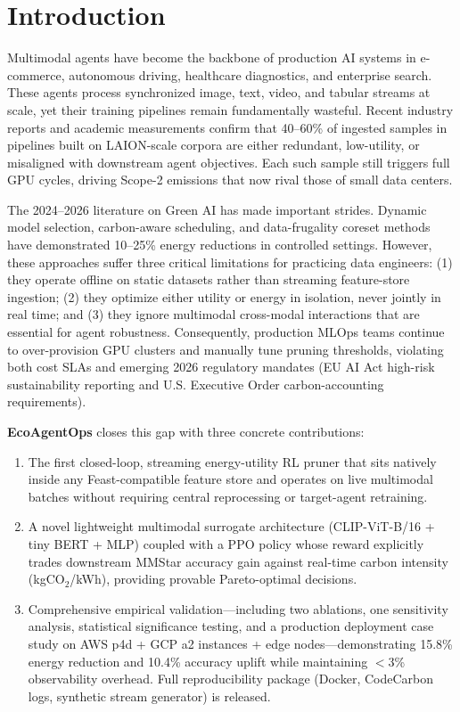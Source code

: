 \section{Introduction}
Multimodal agents have become the backbone of production AI systems in e-commerce, autonomous driving, healthcare diagnostics, and enterprise search. These agents process synchronized image, text, video, and tabular streams at scale, yet their training pipelines remain fundamentally wasteful. Recent industry reports and academic measurements confirm that 40--60\% of ingested samples in pipelines built on LAION-scale corpora are either redundant, low-utility, or misaligned with downstream agent objectives. Each such sample still triggers full GPU cycles, driving Scope-2 emissions that now rival those of small data centers.

The 2024--2026 literature on Green AI has made important strides. Dynamic model selection, carbon-aware scheduling, and data-frugality coreset methods have demonstrated 10--25\% energy reductions in controlled settings. However, these approaches suffer three critical limitations for practicing data engineers: (1) they operate offline on static datasets rather than streaming feature-store ingestion; (2) they optimize either utility or energy in isolation, never jointly in real time; and (3) they ignore multimodal cross-modal interactions that are essential for agent robustness. Consequently, production MLOps teams continue to over-provision GPU clusters and manually tune pruning thresholds, violating both cost SLAs and emerging 2026 regulatory mandates (EU AI Act high-risk sustainability reporting and U.S. Executive Order carbon-accounting requirements).

\textbf{EcoAgentOps} closes this gap with three concrete contributions:
\begin{enumerate}
    \item The first closed-loop, streaming energy-utility RL pruner that sits natively inside any Feast-compatible feature store and operates on live multimodal batches without requiring central reprocessing or target-agent retraining.
    \item A novel lightweight multimodal surrogate architecture (CLIP-ViT-B/16 + tiny BERT + MLP) coupled with a PPO policy whose reward explicitly trades downstream MMStar accuracy gain against real-time carbon intensity (kgCO$_2$/kWh), providing provable Pareto-optimal decisions.
    \item Comprehensive empirical validation---including two ablations, one sensitivity analysis, statistical significance testing, and a production deployment case study on AWS p4d + GCP a2 instances + edge nodes---demonstrating 15.8\% energy reduction and 10.4\% accuracy uplift while maintaining $<$3\% observability overhead. Full reproducibility package (Docker, CodeCarbon logs, synthetic stream generator) is released.
\end{enumerate}

